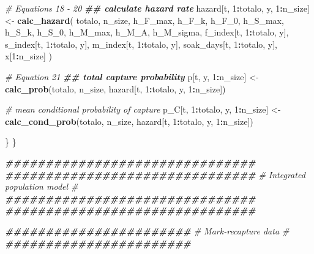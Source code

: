 \documentclass[
]{article}
\newenvironment{Shaded}{\begin{snugshade}}{\end{snugshade}}
\newcommand{\CommentTok}[1]{\textcolor[rgb]{0.56,0.35,0.01}{\textit{#1}}}
\newcommand{\DecValTok}[1]{\textcolor[rgb]{0.00,0.00,0.81}{#1}}
\newcommand{\DocumentationTok}[1]{\textcolor[rgb]{0.56,0.35,0.01}{\textbf{\textit{#1}}}}
\newcommand{\FunctionTok}[1]{\textcolor[rgb]{0.13,0.29,0.53}{\textbf{#1}}}
\newcommand{\NormalTok}[1]{#1}
\newcommand{\OtherTok}[1]{\textcolor[rgb]{0.56,0.35,0.01}{#1}}
\newcommand{\SpecialCharTok}[1]{\textcolor[rgb]{0.81,0.36,0.00}{\textbf{#1}}}
\begin{document}
\begin{Shaded}
\begin{Highlighting}[]
      \CommentTok{\# Equations 18 {-} 20}
      \DocumentationTok{\#\# calculate hazard rate}
\NormalTok{      hazard[t, }\DecValTok{1}\SpecialCharTok{:}\NormalTok{totalo, y, }\DecValTok{1}\SpecialCharTok{:}\NormalTok{n\_size] }\OtherTok{\textless{}{-}} \FunctionTok{calc\_hazard}\NormalTok{(}
\NormalTok{        totalo, n\_size, h\_F\_max, h\_F\_k, h\_F\_0, h\_S\_max, h\_S\_k, h\_S\_0, h\_M\_max,}
\NormalTok{        h\_M\_A, h\_M\_sigma, f\_index[t, }\DecValTok{1}\SpecialCharTok{:}\NormalTok{totalo, y], s\_index[t, }\DecValTok{1}\SpecialCharTok{:}\NormalTok{totalo, y],}
\NormalTok{        m\_index[t, }\DecValTok{1}\SpecialCharTok{:}\NormalTok{totalo, y], soak\_days[t, }\DecValTok{1}\SpecialCharTok{:}\NormalTok{totalo, y], x[}\DecValTok{1}\SpecialCharTok{:}\NormalTok{n\_size]}
\NormalTok{        )}

      \CommentTok{\# Equation 21}
      \DocumentationTok{\#\# total capture probability}
\NormalTok{      p[t, y, }\DecValTok{1}\SpecialCharTok{:}\NormalTok{n\_size] }\OtherTok{\textless{}{-}} \FunctionTok{calc\_prob}\NormalTok{(totalo, n\_size,}
\NormalTok{                                     hazard[t, }\DecValTok{1}\SpecialCharTok{:}\NormalTok{totalo, y, }\DecValTok{1}\SpecialCharTok{:}\NormalTok{n\_size])}
      
      \CommentTok{\# mean conditional probability of capture}
\NormalTok{      p\_C[t, }\DecValTok{1}\SpecialCharTok{:}\NormalTok{totalo, y, }\DecValTok{1}\SpecialCharTok{:}\NormalTok{n\_size] }\OtherTok{\textless{}{-}} \FunctionTok{calc\_cond\_prob}\NormalTok{(totalo, n\_size,}
\NormalTok{                                                      hazard[t, }\DecValTok{1}\SpecialCharTok{:}\NormalTok{totalo,}
\NormalTok{                                                             y, }\DecValTok{1}\SpecialCharTok{:}\NormalTok{n\_size])}
      
\NormalTok{    \}}
\NormalTok{  \}}
  
  
  \DocumentationTok{\#\#\#\#\#\#\#\#\#\#\#\#\#\#\#\#\#\#\#\#\#\#\#\#\#\#\#\#\#\#\#}
  \DocumentationTok{\#\#\#\#\#\#\#\#\#\#\#\#\#\#\#\#\#\#\#\#\#\#\#\#\#\#\#\#\#\#\#}
  \CommentTok{\# Integrated population model \#}
  \DocumentationTok{\#\#\#\#\#\#\#\#\#\#\#\#\#\#\#\#\#\#\#\#\#\#\#\#\#\#\#\#\#\#\#}
  \DocumentationTok{\#\#\#\#\#\#\#\#\#\#\#\#\#\#\#\#\#\#\#\#\#\#\#\#\#\#\#\#\#\#\#}
  
  \DocumentationTok{\#\#\#\#\#\#\#\#\#\#\#\#\#\#\#\#\#\#\#\#\#\#\#}
  \CommentTok{\# Mark{-}recapture data \#}
  \DocumentationTok{\#\#\#\#\#\#\#\#\#\#\#\#\#\#\#\#\#\#\#\#\#\#\#}
  

\end{Highlighting}
\end{Shaded}
\end{document}
